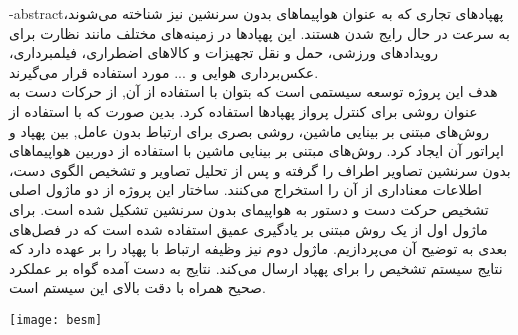 \department{}
\secondsupervisor{}


\fa-abstract{پهپادهای تجاری که به عنوان هواپیما‌های بدون سرنشین 
نیز شناخته می‌شوند، به سرعت در حال رایج شدن هستند. این پهپاد‌ها در زمینه‌های مختلف مانند نظارت برای رویدادهای ورزشی، حمل و نقل تجهیزات
 و کالاهای اضطراری، فیلمبرداری، عکس‌برداری هوایی و ... مورد استفاده قرار می‌گیرند.
  \\
هدف این پروژه توسعه سیستمی است که بتوان با استفاده از آن, از حرکات دست به عنوان روشی برای کنترل پرواز پهپاد‌ها استفاده کرد.
بدین صورت که با استفاده از روش‌های مبتنی بر بینایی ماشین، روشی بصری برای ارتباط بدون عامل, بین پهپاد و اپراتور آن ایجاد کرد.
 روش‌های مبتنی بر بینایی ماشین با استفاده از دوربین هواپیما‌های بدون سرنشین تصاویر اطراف را گرفته و پس
 از تحلیل تصاویر و تشخیص الگوی دست، اطلاعات معناداری از آن را استخراج می‌کنند. ساختار این پروژه از دو ماژول
 اصلی تشخیص حرکت دست
 و دستور به هواپیمای بدون سرنشین تشکیل شده است. برای ماژول اول از یک روش مبتنی بر
 یادگیری عمیق
  استفاده شده است که در فصل‌های بعدی به توضیح آن می‌پردازیم. ماژول دوم نیز وظیفه ارتباط با پهپاد را بر عهده دارد که نتایج سیستم تشخیص را برای پهپاد ارسال می‌کند.
 نتایج به دست آمده گواه بر عملکرد صحیح همراه با دقت بالای این سیستم است.
 }



\vspace*{7cm}
\thispagestyle{empty}
\begin{center}
\texttt{[image: besm]}
\end{center}